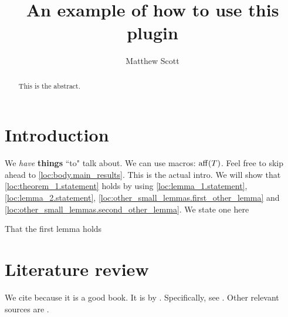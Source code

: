 \documentclass{article}
\title{An example of how to use this plugin}
\author{Matthew Scott}
\begin{document}
\maketitle
\begin{abstract}
This is the abstract.
\end{abstract}
\section{Introduction}
\label{loc:body.introduction}
We \emph{have} \textbf{things} ``to" talk about. We can use macros: $\operatorname{aff}(T)$. Feel free to skip ahead to \autoref{loc:body.main_results}. This is the actual intro. We will show that \autoref{loc:theorem_1.statement} holds by using \autoref{loc:lemma_1.statement}, \autoref{loc:lemma_2.statement}, \autoref{loc:other_small_lemmas.first_other_lemma} and \autoref{loc:other_small_lemmas.second_other_lemma}. We state one here
\begin{lemma}

\label{loc:other_small_lemmas.second_other_lemma}
That the first lemma holds
\end{lemma}
\section{Literature review}
\label{loc:body.literature_review}
We cite \textcite{vershyninHighDimensionalProbabilityIntroduction2018} because it is a good book. It is by \cite[txt]{vershyninHighDimensionalProbabilityIntroduction2018}. Specifically, see \cite[Example 5.4]{vershyninHighDimensionalProbabilityIntroduction2018}. Other relevant sources are \cite{berkCoherenceParameterCharacterizing2022, berkModeladaptedFourierSampling2023}.
\end{document}
